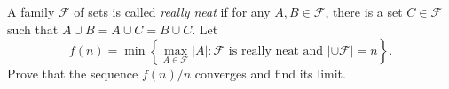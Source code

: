 A family $\mathcal{F}$ of sets is called \textit{really neat} if for any $A,B\in \mathcal{F}$, there is a set $C\in \mathcal{F}$ such that $A\cup B = A\cup C=B\cup C$. Let
$$f(n)=\min \left\{ \max_{A\in \mathcal{F}} |A| \colon \mathcal{F} \text{ is really neat and } |\cup \mathcal{F}| =n\right\} .$$Prove that the sequence $f(n)/n$ converges and find its limit.